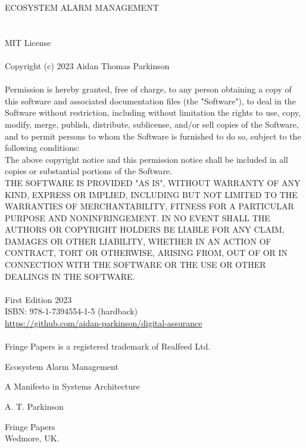 \documentclass[11pt, oneside]{book}   	%
\begin{document}

\begin{center}
\vspace*{50mm}
ECOSYSTEM ALARM MANAGEMENT
\end{center}

\pagebreak

\section*{}
\begin{small}
	MIT License\\
	\\
	Copyright (c) 2023 Aidan Thomas Parkinson\\
	\\
	Permission is hereby granted, free of charge, to any person obtaining a copy of this software and associated documentation files (the "Software"), to deal in the Software without restriction, including without limitation the rights to use, copy, modify, merge, publish, distribute, sublicense, and/or sell copies of the Software, and to permit persons to whom the Software is furnished to do so, subject to the following conditions:\\
	The above copyright notice and this permission notice shall be included in all copies or substantial portions of the Software.\\
	THE SOFTWARE IS PROVIDED "AS IS", WITHOUT WARRANTY OF ANY KIND, EXPRESS OR IMPLIED, INCLUDING BUT NOT LIMITED TO THE WARRANTIES OF MERCHANTABILITY, FITNESS FOR A PARTICULAR PURPOSE AND NONINFRINGEMENT. IN NO EVENT SHALL THE AUTHORS OR COPYRIGHT HOLDERS BE LIABLE FOR ANY CLAIM, DAMAGES OR OTHER LIABILITY, WHETHER IN AN ACTION OF CONTRACT, TORT OR OTHERWISE, ARISING FROM, OUT OF OR IN CONNECTION WITH THE SOFTWARE OR THE USE OR OTHER DEALINGS IN THE SOFTWARE.\\
	\\
	First Edition 2023\\
	ISBN: 978-1-7394554-1-5 (hardback)\\
	\url{https://github.com/aidan-parkinson/digital-assurance}\\
	\\
	Fringe Papers is a registered trademark of Realfeed Ltd.
\end{small}

\pagebreak

\begin{titlepage}
	\centering
    \vspace*{20mm}
	{\huge Ecosystem Alarm Management\par}
    \vspace{0.5cm}
    {\Large A Manifesto in Systems Architecture\par}
    \vspace{0.5cm}
	{\large A. T. Parkinson\par}
	\vfill
	{\large
		\begin{center}
		Fringe Papers\\
		Wedmore, UK.
		\end{center}
	}
\end{titlepage}
\end{document}
